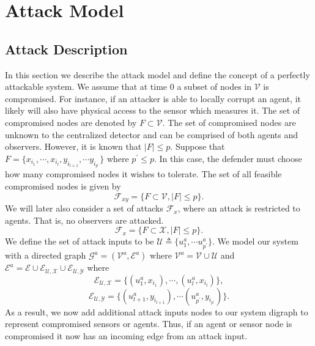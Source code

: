 \documentclass[letterpaper, 10 pt, conference]{ieeeconf}
\begin{document}
\section{Attack Model}
\subsection{Attack Description}
In this section we describe the attack model and define the concept of a perfectly attackable system. We assume that at time $0$ a subset of nodes in $\mathcal{V}$ is compromised. For instance, if an attacker is able to locally corrupt an agent, it likely will also have physical access to the sensor which measures it. The set of compromised nodes are denoted by $F \subset \mathcal{V}$. The set of compromised nodes are unknown to the centralized detector and can be comprised of both agents and observers. However, it is known that $|F| \le p$. Suppose that $F = \{x_{i_1}, \cdots, x_{i_l}, y_{i_{l+1}}, \cdots y_{i_{p^\prime}}\}$ where $p^\prime \le p$. In this case, the defender must choose how many compromised nodes it wishes to tolerate.
The set of all feasible compromised nodes is given by
\begin{equation}
\mathcal{F}_{xy} = \{F \subset \mathcal{V}, |F| \le p\}.
\end{equation}
We will later also consider a set of attacks $\mathcal{F}_{x}$, where an attack is restricted to agents. That is, no observers are attacked.
\begin{equation}
\mathcal{F}_{x} = \{F \subset \mathcal{X}, |F| \le p\}.
\end{equation} 
 We define the set of attack inputs to be $\mathcal{U} \triangleq \{u_1^a, \cdots u_{p^\prime}^a\}$. We model our system with a directed graph $\mathcal{G}^a = (\mathcal{V}^a,\mathcal{E}^a)$ where $\mathcal{V}^a = \mathcal{V} \cup \mathcal{U}$ and $\mathcal{E}^a = \mathcal{E} \cup \mathcal{E}_{\mathcal{U},\mathcal{X}} \cup \mathcal{E}_{\mathcal{U},\mathcal{Y}} $ where 
\begin{equation}
\mathcal{E}_{\mathcal{U},\mathcal{X}} = \{ (u_1^a,x_{i_1}), \cdots, (u_{l}^a,x_{i_l}) \} ,
\end{equation}
\begin{equation}
\mathcal{E}_{\mathcal{U},\mathcal{Y}} = \{(u_{l+1}^a,y_{i_{l+1}}), \cdots (u_{p^\prime}^a, y_{i_{p^\prime}})\}.
\end{equation}
As a result, we now add additional attack inputs nodes to our system digraph to represent compromised sensors or agents. Thus, if an agent or sensor node is compromised it now has an incoming edge from an attack input.
\end{document}

